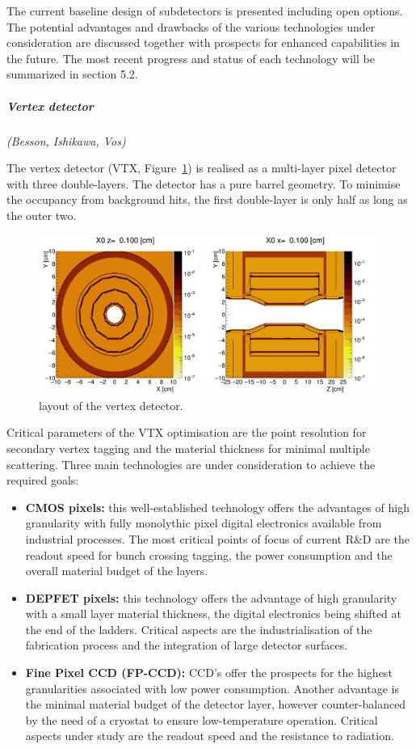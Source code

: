 The current baseline design of subdetectors is presented including open options. The potential advantages and drawbacks of the various technologies under consideration are discussed together with prospects for enhanced capabilities in the future. The most recent progress and status of each technology will be summarized in section 5.2.

\vspace{1cm}
\subparagraph*{\bf Vertex detector}
\textit{(Besson, Ishikawa, Vos)}

The vertex detector (VTX, Figure~\ref{fig:det:vertex}) is realised as a multi-layer pixel detector with three double-layers. The detector has a pure barrel geometry. To minimise the occupancy from background hits,
the first double-layer is only half as long as the outer two. 



\begin{figure}[t!]
\centering
\includegraphics[width=0.6\hsize]{Detector/fig/vertex.png}
\caption{layout of the vertex detector.}
\label{fig:det:vertex}
\end{figure}

Critical parameters of the VTX optimisation are the point resolution for secondary vertex tagging and the material thickness for minimal multiple scattering. Three main technologies are under consideration to achieve the required goals:
\begin{itemize}
    \item {\bf CMOS pixels:} this well-established technology offers the advantages of high granularity with fully monolythic pixel digital electronics available from industrial processes. The most critical points of focus of current R\&D are the readout speed for bunch crossing tagging, the power consumption and the overall material budget of the layers.
    \item {\bf DEPFET pixels:} this technology offers the advantage of high granularity with a small layer material thickness, the digital electronics being shifted at the end of the ladders. Critical aspects are the industrialisation of the fabrication process and the integration of large detector surfaces.
    \item{\bf Fine Pixel CCD (FP-CCD):} CCD's offer the prospects for the highest granularities associated with low power consumption. Another advantage is the minimal material budget of the detector layer, however counter-balanced by the need of a cryostat to ensure low-temperature operation. Critical aspects under study are the readout speed and the resistance to radiation.  
\end{itemize}


